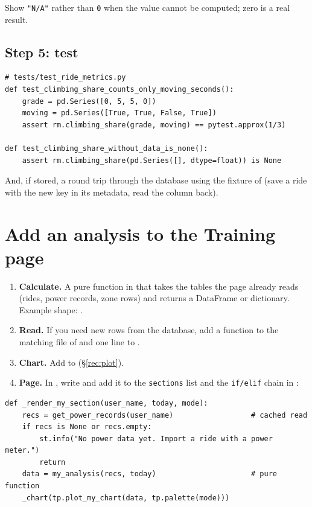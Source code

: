 Show \texttt{"N/A"} rather than \texttt{0} when the value cannot be computed; zero is a real result.

\subsection*{Step 5: test}

\begin{lstlisting}
# tests/test_ride_metrics.py
def test_climbing_share_counts_only_moving_seconds():
    grade = pd.Series([0, 5, 5, 0])
    moving = pd.Series([True, True, False, True])
    assert rm.climbing_share(grade, moving) == pytest.approx(1/3)

def test_climbing_share_without_data_is_none():
    assert rm.climbing_share(pd.Series([], dtype=float)) is None
\end{lstlisting}

And, if stored, a round trip through the database using the  fixture of 
(save a ride with the new key in its metadata, read the column back).

\section{Add an analysis to the Training page}\label{rec:training}

\begin{enumerate}
\item \textbf{Calculate.} A pure function in  that takes the tables the page already reads
  (rides, power records, zone rows) and returns a DataFrame or dictionary. Example shape: .
\item \textbf{Read.} If you need new rows from the database, add a function to the matching file of  and one line to
  .
\item \textbf{Chart.} Add  to  (\S\ref{rec:plot}).
\item \textbf{Page.} In , write  and add it to
  the \texttt{sections} list and the \texttt{if/elif} chain in :
\end{enumerate}

\begin{lstlisting}
def _render_my_section(user_name, today, mode):
    recs = get_power_records(user_name)                  # cached read
    if recs is None or recs.empty:
        st.info("No power data yet. Import a ride with a power meter.")
        return
    data = my_analysis(recs, today)                      # pure function
    _chart(tp.plot_my_chart(data, tp.palette(mode)))
\end{lstlisting}

